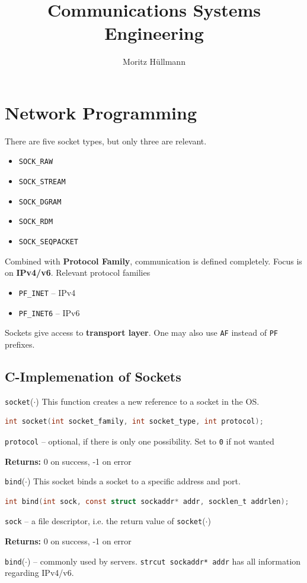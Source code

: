 \documentclass[english]{panikzettel}
\title{Communications Systems Engineering}
\author{Moritz Hüllmann}
\newcommand{\fkt}[1]{\texttt{#1}(\(\cdot\))}
\begin{document}
	\maketitle
	\tableofcontents
	\section{Network Programming}
	There are five socket types, but only three are relevant.
	\begin{itemize}
		\item \texttt{SOCK\_RAW}
		\item \texttt{SOCK\_STREAM}
		\item \texttt{SOCK\_DGRAM}
		\item \texttt{SOCK\_RDM}
		\item \texttt{SOCK\_SEQPACKET}
	\end{itemize}
	Combined with \textbf{Protocol Family}, communication is defined completely.
	Focus is on \textbf{IPv4/v6}.
	Relevant protocol families
	\begin{itemize}
		\item \texttt{PF\_INET} – IPv4
		\item \texttt{PF\_INET6} – IPv6
	\end{itemize}
	Sockets give access to \textbf{transport layer}.
	One may also use \texttt{AF} instead of \texttt{PF} prefixes.
	
	\subsection{C-Implemenation of Sockets}

	\begin{defi}{\fkt{socket}}
		This function creates a new reference to a socket in the OS.
		\begin{lstlisting}[language=C]
			int socket(int socket_family, int socket_type, int protocol);
		\end{lstlisting}
		\tcblower
		\texttt{protocol} – optional, if there is only one possibility. 
		Set to \texttt{0} if not wanted

		\textbf{Returns:} 0 on success, -1 on error
	\end{defi}

	\begin{defi}{\fkt{bind}}
		This socket binds a socket to a specific address and port.
		\begin{lstlisting}[language=C]
			int bind(int sock, const struct sockaddr* addr, socklen_t addrlen);
		\end{lstlisting}
		\tcblower
		\texttt{sock} – a file descriptor, i.e. the return value of \fkt{socket}

		\textbf{Returns:} 0 on success, -1 on error
	\end{defi}
	\fkt{bind} – commonly used by servers.
	\texttt{strcut sockaddr* addr} has all information regarding IPv4/v6.
\end{document}
